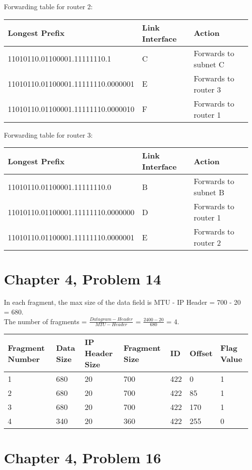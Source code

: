 \documentclass{article}
\begin{document}
Forwarding table for router 2:\\
\begin{tabular}{ |l|l|l| }
  \hline
  Longest Prefix & Link Interface & Action \\ \hline
     11010110.01100001.11111110.1 & C & Forwards to subnet C \\ \hline
     11010110.01100001.11111110.0000001 & E & Forwards to router 3 \\ \hline
     11010110.01100001.11111110.0000010 & F & Forwards to router 1\\ \hline
\end{tabular}

Forwarding table for router 3:\\
\begin{tabular}{ |l|l|l| }
  \hline
  Longest Prefix & Link Interface & Action \\ \hline
     11010110.01100001.11111110.0 & B & Forwards to subnet B\\ \hline
     11010110.01100001.11111110.0000000 & D & Forwards to router 1\\ \hline
     11010110.01100001.11111110.0000001 & E & Forwards to router 2\\ \hline
\end{tabular}

\section*{Chapter 4, Problem 14}
In each fragment, the max size of the data field is MTU - IP Header = 700 - 20 = 680.\\
\newline The number of fragments = $\frac{Datagram - Header}{MTU - Header}$ = $\frac{2400-20}{680}$ = 4.\\
\newline 
\begin{tabular}{ |l|l|l|l|l|l|l| }
  \hline
  Fragment Number & Data Size & IP Header Size & Fragment Size & ID & Offset & Flag Value \\ \hline
      1 & 680 & 20 & 700 & 422 & 0 & 1\\ \hline
      2 & 680 & 20 & 700 & 422 & 85 & 1\\ \hline
      3 & 680 & 20 & 700 & 422 & 170 & 1\\ \hline
      4 & 340 & 20 & 360 & 422 & 255 & 0\\ \hline
\end{tabular}

\section*{Chapter 4, Problem 16}
\end{document}
